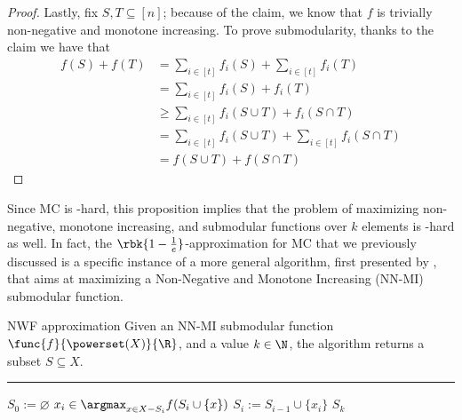 \documentclass[a4paper, 12pt]{report}
\begin{document}
\begin{proof}
        Lastly, fix $S, T \subseteq [n]$; because of the claim, we know that $f$ is trivially non-negative and monotone increasing. To prove submodularity, thanks to the claim we have that
        \begin{equation*}
            \begin{split}
                f(S) + f(T) &= \sum_{i \in [t]}{f_i(S)} + \sum_{i \in [t]}{f_i(T)} \\
                            &= \sum_{i \in [t]}{f_i(S) + f_i(T)} \\
                            &\ge \sum_{i \in [t]}{f_i(S \cup T) + f_i(S \cap T)} \\
                            &= \sum_{i \in [t]}{f_i(S \cup T)} + \sum_{i \in [t]}{f_i(S \cap T)} \\
                            &= f(S \cup T) + f(S \cap T)
            \end{split}
        \end{equation*}
    \end{proof}

    Since MC is \NPclass-hard, this proposition implies that the problem of maximizing non-negative, monotone increasing, and submodular functions over $k$ elements is \NPclass-hard as well. In fact, the $\rbk{1 - \tfrac{1}{e}}$-approximation for MC that we previously discussed is a specific instance of a more general algorithm, first presented by \textcite{nwf}, that aims at maximizing a Non-Negative and Monotone Increasing (NN-MI) submodular function.

    \begin{framedalgo}{NWF approximation}
        Given an NN-MI submodular function $\func{f}{\powerset(X)}{\R}$, and a value $k \in \N$, the algorithm returns a subset $S \subseteq X$. \\
        \hrule

        \quad
        \begin{algorithmic}[1]
                \State $S_0 := \varnothing$
                    \State $\displaystyle x_i \in \argmax_{x \in X - S_i}{f(S_i \cup \{x\})}$ 
                    \State $S_i := S_{i - 1} \cup \{x_i\}$
                \EndFor
                \State {} $S_k$
            \EndFunction
        \end{algorithmic}
    \end{framedalgo}
\end{document}
